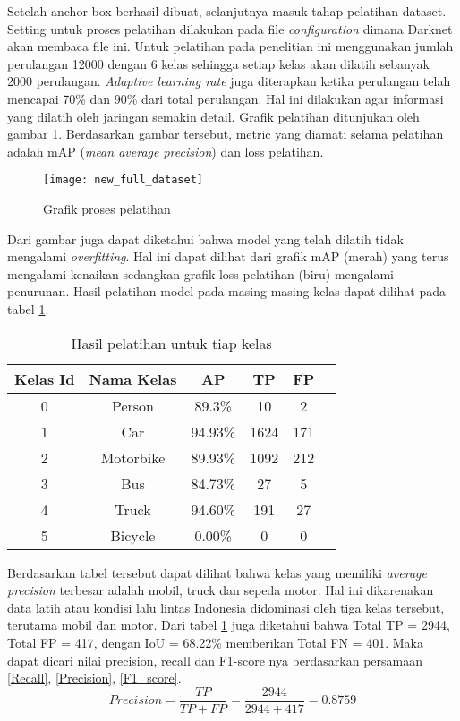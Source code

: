 \documentclass[../thesis.tex]{subfiles}
\begin{document}
Setelah anchor box berhasil dibuat, selanjutnya masuk tahap pelatihan dataset. Setting untuk proses pelatihan dilakukan pada file \textit{configuration} dimana Darknet akan membaca file ini. Untuk pelatihan pada penelitian ini menggunakan jumlah perulangan 12000 dengan 6 kelas sehingga setiap kelas akan dilatih sebanyak 2000 perulangan. 
\textit{Adaptive learning rate} juga diterapkan ketika perulangan telah mencapai 70\% dan 90\% dari total perulangan. Hal ini dilakukan agar informasi yang dilatih oleh jaringan semakin detail. Grafik pelatihan ditunjukan oleh gambar \ref{train_darknet}. Berdasarkan gambar tersebut, metric yang diamati selama pelatihan adalah mAP (\textit{mean average precision}) dan loss pelatihan.
\begin{figure}[htp]
	\centering
	\texttt{[image: new\_full\_dataset]}
	\caption{Grafik proses pelatihan}
	\label{train_darknet}
\end{figure}
Dari gambar juga dapat diketahui bahwa model yang telah dilatih tidak mengalami \textit{overfitting}. Hal ini dapat dilihat dari grafik mAP (merah) yang terus mengalami kenaikan sedangkan grafik loss pelatihan (biru) mengalami penurunan.
Hasil pelatihan model pada masing-masing kelas dapat dilihat pada tabel \ref{Tabel_training}.
\begin{table}[htp]
\centering
\begin{tabular}{ cccccc }
	\hline 
	Kelas Id & Nama Kelas & AP & TP & FP\\
	\hline
	0& Person & 89.3\% & 10 & 2\\
	1 & Car & 94.93\% & 1624 & 171\\
	2 & Motorbike& 89.93\% &1092& 212 \\
	3 & Bus & 84.73\% & 27& 5 \\
	4 & Truck & 94.60\% & 191 & 27\\
	5 & Bicycle & 0.00\% &0 & 0 \\
\end{tabular}
\caption{Hasil pelatihan untuk tiap kelas}
\label{Tabel_training}
\end{table} 
Berdasarkan tabel tersebut dapat dilihat bahwa kelas yang memiliki \textit{average precision} terbesar adalah mobil, truck dan sepeda motor. Hal ini dikarenakan data latih atau kondisi lalu lintas Indonesia didominasi oleh tiga kelas tersebut, terutama mobil dan motor. 
Dari tabel \ref{Tabel_training} juga diketahui bahwa Total TP = 2944, Total FP = 417, dengan IoU = 68.22\% memberikan Total FN = 401. Maka dapat dicari nilai precision, recall dan F1-score nya berdasarkan persamaan \ref{Recall}, \ref{Precision}, \ref{F1_score}.
\begin{equation} \label{Precision}
	Precision = \frac{TP}{TP+FP} = \frac{2944}{2944+417} = 0.8759
\end{equation}
\end{document}
